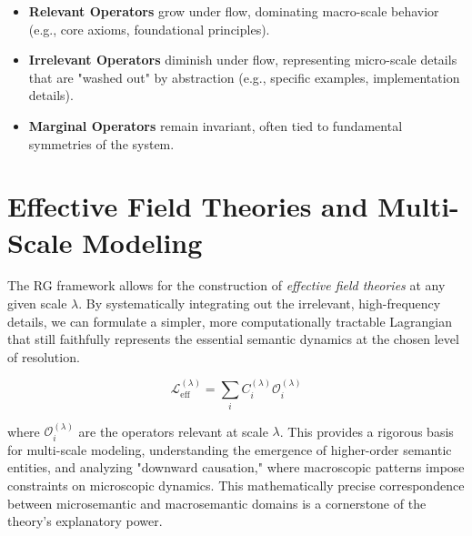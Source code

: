 \begin{itemize}

    \item \textbf{Relevant Operators} grow under flow, dominating macro-scale behavior (e.g., core axioms, foundational principles).

    \item \textbf{Irrelevant Operators} diminish under flow, representing micro-scale details that are "washed out" by abstraction (e.g., specific examples, implementation details).

    \item \textbf{Marginal Operators} remain invariant, often tied to fundamental symmetries of the system.

\end{itemize}


\section{Effective Field Theories and Multi-Scale Modeling}
\label{sec:effective_field_theories_and_multi_scale_modeling}

The RG framework allows for the construction of \textit{effective field theories} at any given scale \(\lambda\). By systematically integrating out the irrelevant, high-frequency details, we can formulate a simpler, more computationally tractable Lagrangian that still faithfully represents the essential semantic dynamics at the chosen level of resolution.

\begin{equation}
\mathcal{L}_{\mathrm{eff}}^{(\lambda)} = \sum_{i} C_{i}^{(\lambda)} \mathcal{O}_{i}^{(\lambda)}
\end{equation}

where \(\mathcal{O}_{i}^{(\lambda)}\) are the operators relevant at scale \(\lambda\). This provides a rigorous basis for multi-scale modeling, understanding the emergence of higher-order semantic entities, and analyzing "downward causation," where macroscopic patterns impose constraints on microscopic dynamics. This mathematically precise correspondence between microsemantic and macrosemantic domains is a cornerstone of the theory's explanatory power. 